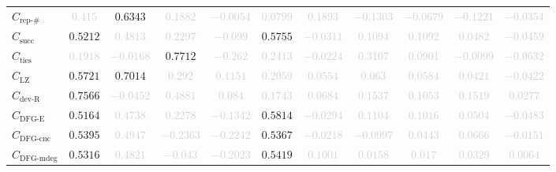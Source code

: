 \documentclass{standalone}
\newcommand{\repnumname}{\text{rep-\#}}
\newcommand{\repnum}{C_{\repnumname}}
\newcommand{\dfgedgesname}{\text{DFG-E}}
\newcommand{\dfgedges}{C_{\dfgedgesname}}
\newcommand{\dfgcncname}{\text{DFG-cnc}}
\newcommand{\dfgcnc}{C_{\dfgcncname}}
\newcommand{\dfgmaxdegname}{\text{DFG-mdeg}}
\newcommand{\dfgmaxdeg}{C_{\dfgmaxdegname}}
\newcommand{\numberofneighborhoodsname}{\text{succ}}
\newcommand{\numberofneighborhoods}{C_{\numberofneighborhoodsname}}
\newcommand{\numberoftiesname}{\text{ties}}
\newcommand{\numberofties}{C_{\numberoftiesname}}
\newcommand{\lempelzivname}{\text{LZ}}
\newcommand{\lempelziv}{C_{\lempelzivname}}
\newcommand{\deviationfromrandomname}{\text{dev-R}}
\newcommand{\deviationfromrandom}{C_{\deviationfromrandomname}}
\begin{document}
\begin{tabular}{lcccccccccc}
$\repnum$ & \textcolor{lightgray}{$0.415$} & $0.6343$ & \textcolor{lightgray}{$0.1882$} & \textcolor{lightgray}{$-0.0054$} & \textcolor{lightgray}{$0.0799$} & \textcolor{lightgray}{$0.1893$} & \textcolor{lightgray}{$-0.1303$} & \textcolor{lightgray}{$-0.0679$} & \textcolor{lightgray}{$-0.1221$} & \textcolor{lightgray}{$-0.0354$} \\ 
$\numberofneighborhoods$ & $0.5212$ & \textcolor{lightgray}{$0.4813$} & \textcolor{lightgray}{$0.2297$} & \textcolor{lightgray}{$-0.099$} & $0.5755$ & \textcolor{lightgray}{$-0.0311$} & \textcolor{lightgray}{$0.1094$} & \textcolor{lightgray}{$0.1092$} & \textcolor{lightgray}{$0.0482$} & \textcolor{lightgray}{$-0.0459$} \\ 
$\numberofties$ & \textcolor{lightgray}{$0.1918$} & \textcolor{lightgray}{$-0.0168$} & $0.7712$ & \textcolor{lightgray}{$-0.262$} & \textcolor{lightgray}{$0.2413$} & \textcolor{lightgray}{$-0.0224$} & \textcolor{lightgray}{$0.3107$} & \textcolor{lightgray}{$0.0901$} & \textcolor{lightgray}{$-0.0099$} & \textcolor{lightgray}{$-0.0632$} \\ 
$\lempelziv$ & $0.5721$ & $0.7014$ & \textcolor{lightgray}{$0.292$} & \textcolor{lightgray}{$0.1151$} & \textcolor{lightgray}{$0.2059$} & \textcolor{lightgray}{$0.0554$} & \textcolor{lightgray}{$0.063$} & \textcolor{lightgray}{$0.0584$} & \textcolor{lightgray}{$0.0421$} & \textcolor{lightgray}{$-0.0422$} \\ 
$\deviationfromrandom$ & $0.7566$ & \textcolor{lightgray}{$-0.0452$} & \textcolor{lightgray}{$0.4881$} & \textcolor{lightgray}{$0.084$} & \textcolor{lightgray}{$0.1743$} & \textcolor{lightgray}{$0.0684$} & \textcolor{lightgray}{$0.1537$} & \textcolor{lightgray}{$0.1053$} & \textcolor{lightgray}{$0.1519$} & \textcolor{lightgray}{$0.0277$} \\ 
$\dfgedges$ & $0.5164$ & \textcolor{lightgray}{$0.4738$} & \textcolor{lightgray}{$0.2278$} & \textcolor{lightgray}{$-0.1342$} & $0.5814$ & \textcolor{lightgray}{$-0.0294$} & \textcolor{lightgray}{$0.1104$} & \textcolor{lightgray}{$0.1016$} & \textcolor{lightgray}{$0.0504$} & \textcolor{lightgray}{$-0.0483$} \\ 
$\dfgcnc$ & $0.5395$ & \textcolor{lightgray}{$0.4947$} & \textcolor{lightgray}{$-0.2363$} & \textcolor{lightgray}{$-0.2242$} & $0.5367$ & \textcolor{lightgray}{$-0.0218$} & \textcolor{lightgray}{$-0.0997$} & \textcolor{lightgray}{$0.0443$} & \textcolor{lightgray}{$0.0666$} & \textcolor{lightgray}{$-0.0151$} \\ 
$\dfgmaxdeg$ & $0.5316$ & \textcolor{lightgray}{$0.4821$} & \textcolor{lightgray}{$-0.043$} & \textcolor{lightgray}{$-0.2023$} & $0.5419$ & \textcolor{lightgray}{$0.1001$} & \textcolor{lightgray}{$0.0158$} & \textcolor{lightgray}{$0.017$} & \textcolor{lightgray}{$0.0329$} & \textcolor{lightgray}{$0.0064$} \\ 

\end{tabular}
\end{document}
